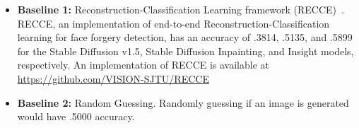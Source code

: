 \documentclass[10pt]{article}
\begin{document}
\begin{itemize}

\item {\bf Baseline 1: } Reconstruction-Classification Learning framework (RECCE)~\cite{Cao_2022_CVPR}. RECCE, an implementation of end-to-end Reconstruction-Classification learning for face forgery detection, has an accuracy of .3814, .5135, and .5899 for the Stable Diffusion v1.5, Stable Diffusion Inpainting, and Insight models, respectively. An implementation of RECCE is available at \url{https://github.com/VISION-SJTU/RECCE}


\item {\bf Baseline 2: } Random Guessing. Randomly guessing if an image is generated would have .5000 accuracy.  %

\end{itemize}




{\small


}
\end{document}
